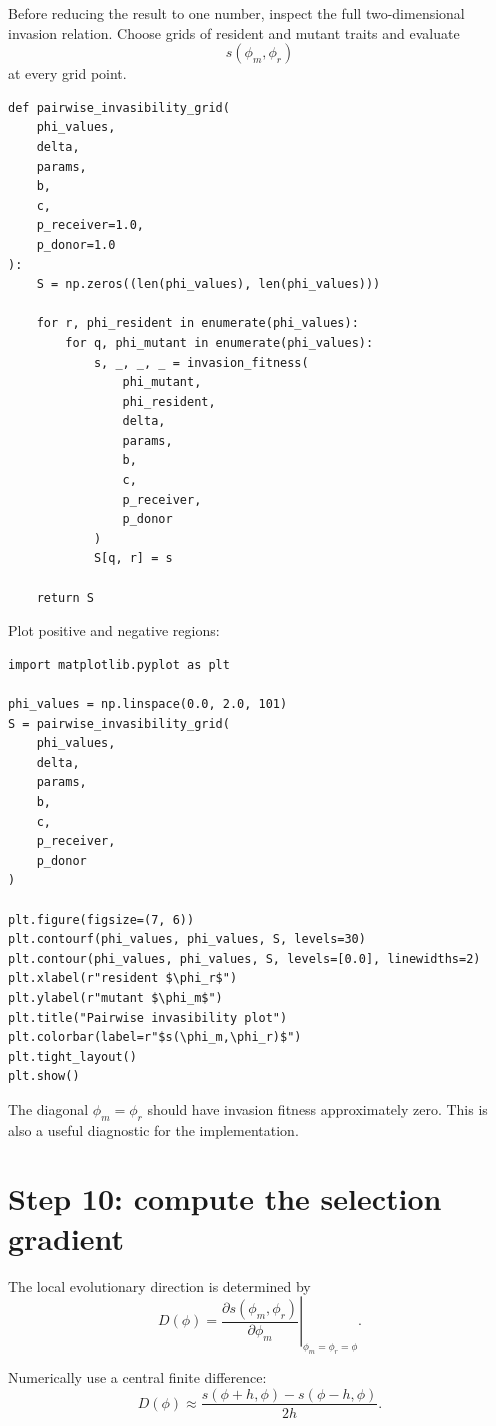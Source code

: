 \documentclass[11pt]{article}
\begin{document}
Before reducing the result to one number, inspect the full two-dimensional invasion relation. Choose grids of resident and mutant traits and evaluate
\[
s(\phi_m,\phi_r)
\]
at every grid point.

\begin{lstlisting}
def pairwise_invasibility_grid(
    phi_values,
    delta,
    params,
    b,
    c,
    p_receiver=1.0,
    p_donor=1.0
):
    S = np.zeros((len(phi_values), len(phi_values)))

    for r, phi_resident in enumerate(phi_values):
        for q, phi_mutant in enumerate(phi_values):
            s, _, _, _ = invasion_fitness(
                phi_mutant,
                phi_resident,
                delta,
                params,
                b,
                c,
                p_receiver,
                p_donor
            )
            S[q, r] = s

    return S
\end{lstlisting}

Plot positive and negative regions:

\begin{lstlisting}
import matplotlib.pyplot as plt

phi_values = np.linspace(0.0, 2.0, 101)
S = pairwise_invasibility_grid(
    phi_values,
    delta,
    params,
    b,
    c,
    p_receiver,
    p_donor
)

plt.figure(figsize=(7, 6))
plt.contourf(phi_values, phi_values, S, levels=30)
plt.contour(phi_values, phi_values, S, levels=[0.0], linewidths=2)
plt.xlabel(r"resident $\phi_r$")
plt.ylabel(r"mutant $\phi_m$")
plt.title("Pairwise invasibility plot")
plt.colorbar(label=r"$s(\phi_m,\phi_r)$")
plt.tight_layout()
plt.show()
\end{lstlisting}

The diagonal $\phi_m=\phi_r$ should have invasion fitness approximately zero. This is also a useful diagnostic for the implementation.

\section{Step 10: compute the selection gradient}

The local evolutionary direction is determined by
\[
\boxed{
D(\phi)
=
\left.
\frac{\partial s(\phi_m,\phi_r)}{\partial\phi_m}
\right|_{\phi_m=\phi_r=\phi}.
}
\]

Numerically use a central finite difference:
\[
\boxed{
D(\phi)
\approx
\frac{
 s(\phi+h,\phi)
 -
 s(\phi-h,\phi)
}{2h}.
}
\]
\end{document}
